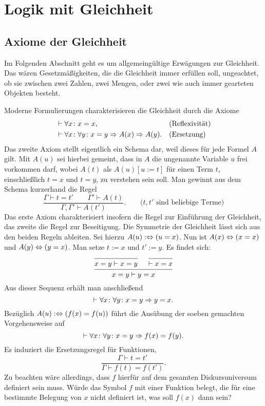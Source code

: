 \newpage
\section{Logik mit Gleichheit}

\subsection{Axiome der Gleichheit}

Im Folgenden Abschnitt geht es um allgemeingültige Erwägungen zur
Gleichheit. Das wären Gesetzmäßigkeiten, die die Gleichheit immer
erfüllen soll, ungeachtet, ob sie zwischen zwei Zahlen, zwei Mengen,
oder zwei wie auch immer gearteten Objekten besteht.

Moderne Formulierungen charakterisieren die Gleichheit durch die Axiome
\begin{align*}
&\vdash\forall x\colon x=x, &&\text{(Reflexivität)}\\
&\vdash\forall x\colon\forall y\colon x=y\Rightarrow A(x)\Rightarrow A(y).
&&\text{(Ersetzung)}
\end{align*}
Das zweite Axiom stellt eigentlich ein Schema dar, weil dieses für jede
Formel $A$ gilt. Mit $A(u)$ sei hierbei gemeint, dass in $A$ die ungenannte
Variable $u$ frei vorkommen darf, wobei $A(t)$ als $A(u)[u:=t]$ für einen
Term $t$, einschließlich $t=x$ und $t=y$, zu verstehen sein soll. Man gewinnt
aus dem Schema kurzerhand die Regel
\[\dfrac{\Gamma\vdash t=t'\qquad\Gamma'\vdash A(t)}
{\Gamma,\Gamma'\vdash A(t')}.\qquad\text{($t,t'$ sind beliebige Terme)}\]
Das erste Axiom charakterisiert insofern die Regel zur Einführung
der Gleichheit, das zweite die Regel zur Beseitigung. Die Symmetrie
der Gleichheit lässt sich aus den beiden Regeln ableiten. Sei hierzu
$A(u):\Leftrightarrow (u=x)$. Nun ist $A(x)\Leftrightarrow (x=x)$ und
$A(y)\Leftrightarrow (y=x)$. Man setze $t:=x$ und $t':=y$. Es findet sich:
\[
\begin{prooftree}
  \infer0{x=y\vdash x=y}
  \infer0{\vdash x=x}
\infer2{x=y\vdash y=x}
\end{prooftree}
\]
Aus dieser Sequenz erhält man anschließend
\[\vdash\forall x\colon\forall y\colon x=y\Rightarrow y=x.\]
Bezüglich $A(u):\Leftrightarrow (f(x)=f(u))$ führt die Ausübung der soeben
gemachten Vorgehensweise auf
\[\vdash\forall x\colon\forall y\colon x=y\Rightarrow f(x)=f(y).\]
Es induziert die Ersetzungsregel für Funktionen,
\[\dfrac{\Gamma\vdash t=t'}{\Gamma\vdash f(t)=f(t')}.\]
Zu beachten wäre allerdings, dass $f$ hierfür auf dem gesamten
Diskursuniversum definiert sein muss. Würde das Symbol $f$ mit einer
Funktion belegt, die für eine bestimmte Belegung von $x$ nicht definiert
ist, was soll $f(x)$ dann sein?

